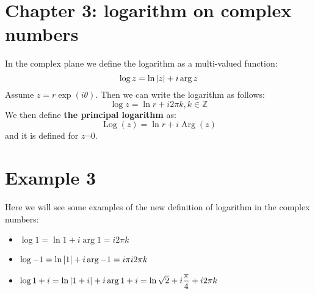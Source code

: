 \documentclass{report}
\def\Z{\mathbb{Z}}
\DeclarePairedDelimiter\abs{\lvert}{\rvert}%
\renewcommand{\exp}[1]{\operatorname{exp}\left(#1\right)}
\newcommand{\Log}[1]{\operatorname{Log}\left(#1\right)}
\newcommand{\Arg}[1]{\operatorname{Arg}\left(#1\right)}
\begin{document}
    \section*{Chapter 3: logarithm on complex numbers}
    In the complex plane we define the logarithm as a multi-valued function:
    \begin{equation*}
        \log{z} = \ln{\abs{z}} + i\arg{z}
    \end{equation*}
     Assume $z = r\exp{i\theta}$. Then we can write the logarithm as follows:
     \begin{equation*}
        \log{z} = \ln{r} + i2\pi k, k\in \Z
     \end{equation*}
     We then define \textbf{the principal logarithm} as:
     \begin{equation*}
        \Log{z} = \ln{r} + i\Arg{z}
     \end{equation*}
     and it is defined for $z\neg 0$.
     \section*{Example 3}
     Here we will see some examples of the new definition of logarithm in the complex numbers:
     \begin{itemize}
         \item $\log{1} = \ln{1} + i\arg{1} = i2\pi k$
         \item $\log{-1} = \ln{\abs{1}} + i\arg{-1} = i\pi i2\pi k$
         \item $\log{1+i} = \ln{\abs{1+i}} + i\arg{1+i} = \ln{\sqrt{2}} +i\dfrac{\pi}{4} + i2\pi k$
     \end{itemize}
\end{document}
